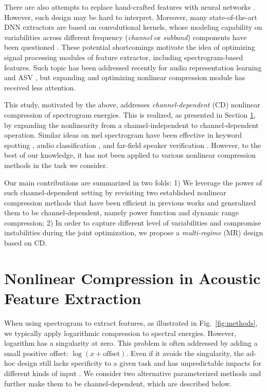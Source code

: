\documentclass{article}
\begin{document}
There are also attempts to replace hand-crafted features with neural networks \cite{sincnet, learnable_filterbanks2018, rawnet2019, wav2spk}. However, such design may be hard to interpret. Moreover, many state-of-the-art DNN extractors are based on convolutional kernels, whose modeling capability on variabilities across different frequency (\emph{channel} or \emph{subband}) components have been questioned \cite{sincnet, sincnet2_2019}. These potential shortcomings motivate the idea of optimizing signal processing modules of feature extractor, including spectrogram-based features. Such topic has been addressed recently for audio representation learning \cite{data_driven_harmonics} and ASV \cite{learnable_mfcc2021}, but expanding and optimizing nonlinear compression module has received less attention.

This study, motivated by the above, addresses \emph{channel-dependent} (CD) nonlinear compression of spectrogram energies. This is realized, as presented in Section \ref{sec:dynacompress}, by expanding the nonlinearity from a channel-independent to channel-dependent operation. Similar ideas on mel spectrogram have been effective in keyword spotting \cite{pcen_2017}, audio classification \cite{pcen_dcase_2021}, and far-field speaker verification \cite{pcen_pcmn_asv}. However, to the best of our knowledge, it has not been applied to various nonlinear compression methods in the task we consider. 

Our main contributions are summarized in two folds: 1) We leverage the power of such channel-dependent setting by revisiting two established nonlinear compression methods that have been efficient in previous works and generalized them to be channel-dependent, namely power function and dynamic range compression; 2) In order to capture different level of variabilities and compromise instabilities during the joint optimization, we propose a \emph{multi-regime} (MR) design based on CD.


\section{Nonlinear Compression in Acoustic Feature Extraction}
\label{sec:dynacompress}
When using spectrogram to extract features, as illustrated in Fig.~\ref{fig:methods}, we typically apply logarithmic compression to spectral energies. However, logarithm has a singularity at zero. This problem is often addressed by adding a small positive offset: $\log(x + \mathrm{offset})$. Even if it avoids the singularity, the ad-hoc design still lacks specificity to a given task and has unpredictable impacts for different kinds of input \cite{pcen_2017}. We consider two alternative parameterized methods and further make them to be channel-dependent, which are described below.
\end{document}
